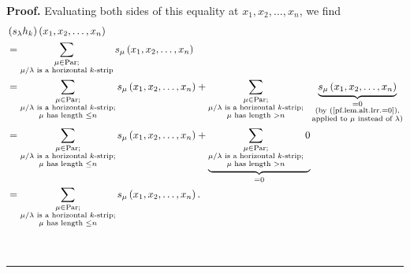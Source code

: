 \documentclass[numbers=enddot,12pt,final,onecolumn,notitlepage]{scrartcl}%
\theoremstyle{definition}
\newenvironment{proof}[1][Proof]{\noindent\textbf{#1.} }{\ \rule{0.5em}{0.5em}}
\let\sumnonlimits\sum
\renewcommand{\sum}{\sumnonlimits\limits}
\newenvironment{vershort}{}{}
\begin{document}
\begin{proof}
\begin{vershort}
Evaluating both sides of this equality at $x_{1},x_{2},\ldots,x_{n}$, we find%
\begin{align*}
&  \left(  s_{\lambda}h_{k}\right)  \left(  x_{1},x_{2},\ldots,x_{n}\right) \\
&  =\sum_{\substack{\mu\in\operatorname*{Par};\\\mu/\lambda\text{ is a
horizontal }k\text{-strip}}}s_{\mu}\left(  x_{1},x_{2},\ldots,x_{n}\right) \\
&  =\sum_{\substack{\mu\in\operatorname*{Par};\\\mu/\lambda\text{ is a
horizontal }k\text{-strip;}\\\mu\text{ has length }\leq n}}s_{\mu}\left(
x_{1},x_{2},\ldots,x_{n}\right)  +\sum_{\substack{\mu\in\operatorname*{Par}%
;\\\mu/\lambda\text{ is a horizontal }k\text{-strip;}\\\mu\text{ has length
}>n}}\ \ \underbrace{s_{\mu}\left(  x_{1},x_{2},\ldots,x_{n}\right)
}_{\substack{=0\\\text{(by (\ref{pf.lem.alt.lrr.=0}),}\\\text{applied to }%
\mu\text{ instead of }\lambda\text{)}}}\\
&  =\sum_{\substack{\mu\in\operatorname*{Par};\\\mu/\lambda\text{ is a
horizontal }k\text{-strip;}\\\mu\text{ has length }\leq n}}s_{\mu}\left(
x_{1},x_{2},\ldots,x_{n}\right)  +\underbrace{\sum_{\substack{\mu
\in\operatorname*{Par};\\\mu/\lambda\text{ is a horizontal }k\text{-strip;}%
\\\mu\text{ has length }>n}}0}_{=0}\\
&  =\sum_{\substack{\mu\in\operatorname*{Par};\\\mu/\lambda\text{ is a
horizontal }k\text{-strip;}\\\mu\text{ has length }\leq n}}s_{\mu}\left(
x_{1},x_{2},\ldots,x_{n}\right)  .
\end{align*}

\end{vershort}


\end{proof}
\end{document}
